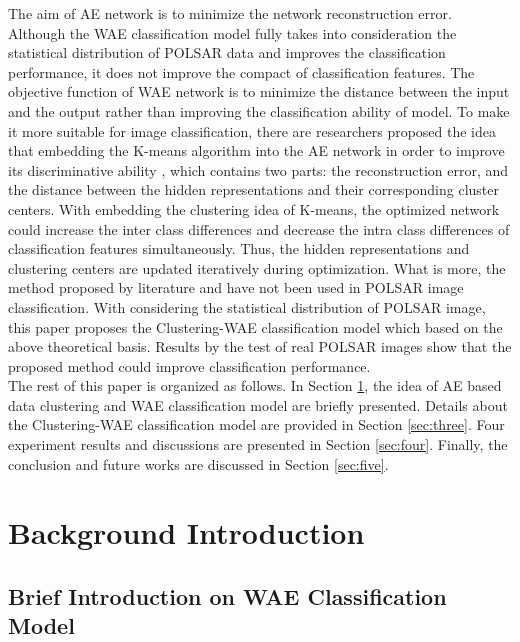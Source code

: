 \documentclass[11pt, a4paper, onecolumn, oneside]{article}
\begin{document}
The aim of AE network is to minimize the network reconstruction error. Although the WAE classification model fully takes into consideration the statistical distribution of POLSAR data and improves the classification performance, it does not improve the compact of classification features. The objective function of WAE network is to minimize the distance between the input and the output rather than improving the classification ability of model. To make it more suitable for image classification, there are researchers proposed the idea that embedding the K-means algorithm into the AE network in order to improve its discriminative ability \cite{u}, which contains two parts: the reconstruction error, and the distance between the hidden representations and their corresponding cluster centers. With embedding the clustering idea of K-means, the optimized network could increase the inter class differences and decrease the intra class differences of classification features simultaneously. Thus, the hidden representations and clustering centers are updated iteratively during optimization. What is more, the method proposed by literature \cite{u} and \cite{v} have not been used in POLSAR image classification. With considering the statistical distribution of POLSAR image, this paper proposes the Clustering-WAE classification model which based on the above theoretical basis. Results by the test of real POLSAR images show that the proposed method could improve classification performance.\\

The rest of this paper is organized as follows. In Section \ref{sec:two}, the idea of AE based data clustering and WAE classification model are briefly presented. Details about the Clustering-WAE classification model are provided in Section \ref{sec:three}. Four experiment results and discussions are presented in Section \ref{sec:four}. Finally, the conclusion and future works are discussed in Section \ref{sec:five}.

\section{Background Introduction} \label{sec:two}
\subsection{Brief Introduction on WAE Classification Model}
\end{document}

